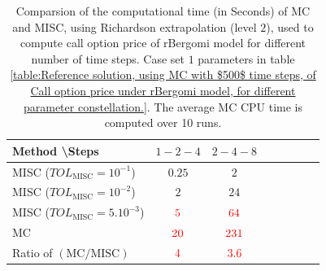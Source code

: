 \begin{table}[!h]
	\centering
	\begin{tabular}{l*{6}{c}r}
		Method \textbackslash  Steps            & $1-2-4$ & $2-4-8$   \\
		\hline
		MISC ($TOL_{\text{MISC}}=10^{-1}$)  & $0.25$ & $2$ &   \\
		MISC ($TOL_{\text{MISC}}=10^{-2}$)  & $2$ & $24$   \\
		MISC ($TOL_{\text{MISC}}=5.10^{-3}$)  & ${\color{red}5}$ & ${\color{red}64}$  \\	
		\hline
		MC    & ${\color{red}20}$  & ${\color{red}231}$  \\
		
		\hline
		Ratio of $\left(\text{MC}/ \text{MISC} \right)$  &${\color{red}4}$ & ${\color{red}  3.6}$   \\
		\hline
	\end{tabular}
	\caption{Comparsion of the computational time (in Seconds) of  MC and MISC, using Richardson extrapolation (level $2$), used to compute call option price of rBergomi model for different number of time steps. Case set $1$ parameters in table \ref{table:Reference solution, using MC with $500$ time steps, of Call option price under rBergomi model, for different parameter constellation.}. The
		average MC CPU time is computed over 10 runs.}
	\label{Comparsion of the computational time of  MC and MISC, using Richardson extrapolation (level $2$), used to compute Call option price of rBergomi model for different number of time steps. Case set $1$ parameters}
\end{table}











